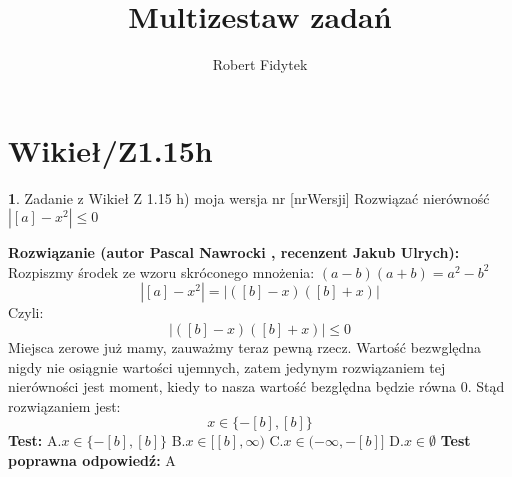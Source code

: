 \documentclass[12pt, a4paper]{article}
\title{Multizestaw zadań}
\author{Robert Fidytek}
\date{}
\theoremstyle{definition} %
\newtheorem{zad}{}
\newcommand{\kategoria}[1]{\section{#1}} %
\newcommand{\zadStart}[1]{\begin{zad}#1\newline} %
\newcommand{\zadStop}{\end{zad}}   %
\newcommand{\rozwStart}[2]{\noindent \textbf{Rozwiązanie (autor #1 , recenzent #2): }\newline} %
\newcommand{\odpStop}{\newline}                                             %
\newcommand{\testStart}{\noindent \textbf{Test:}\newline} %
\newcommand{\testStop}{\newline} %
\newcommand{\kluczStart}{\noindent \textbf{Test poprawna odpowiedź:}\newline} %
\newcommand{\kluczStop}{\newline} %
\begin{document}
\maketitle



\kategoria{Wikieł/Z1.15h}
\zadStart{Zadanie z Wikieł Z 1.15 h) moja wersja nr [nrWersji]}
Rozwiązać nierówność $|[a]-x^2|\leq0$
\zadStop
\rozwStart{Pascal Nawrocki}{Jakub Ulrych}
Rozpiszmy środek ze wzoru skróconego mnożenia: $(a-b)(a+b)=a^2-b^2$
$$|[a]-x^2|=|([b]-x)([b]+x)|$$
Czyli:
$$|([b]-x)([b]+x)|\leq0$$
Miejsca zerowe już mamy, zauważmy teraz pewną rzecz. Wartość bezwględna nigdy nie osiągnie wartości ujemnych, zatem jedynym rozwiązaniem tej nierówności jest moment, kiedy to nasza wartość bezględna będzie równa 0. Stąd rozwiązaniem jest:
$$x\in\{-[b],[b]\}$$
\odpStop
\testStart
A.$x\in\{-[b],[b]\}$
B.$x\in[[b],\infty)$
C.$x\in(-\infty,-[b]]$
D.$x\in\emptyset$
\testStop
\kluczStart
A
\kluczStop
\end{document}
